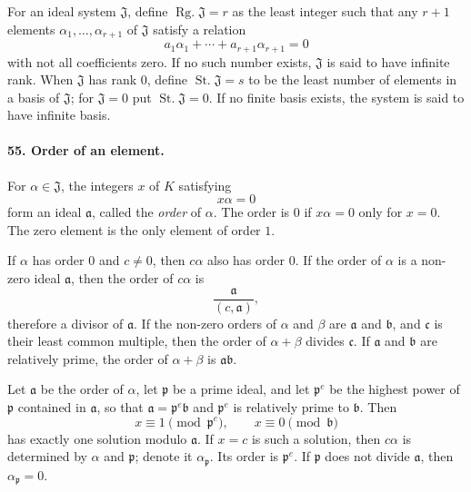 \documentclass[11pt]{article}
\newcommand{\Rg}{\operatorname{Rg.}}
\newcommand{\St}{\operatorname{St.}}
\begin{document}
For an ideal system $\mathfrak J$, define $\Rg\mathfrak J=r$ as the least integer such that any $r+1$ elements $\alpha_1,
\ldots,\alpha_{r+1}$ of $\mathfrak J$ satisfy a relation
\[
  a_1\alpha_1+\cdots+a_{r+1}\alpha_{r+1}=0
\]
with not all coefficients zero. If no such number exists, $\mathfrak J$ is said to have infinite rank. When $\mathfrak J$ has rank $0$, define $\St\mathfrak J=s$ to be the least number of elements in a basis of $\mathfrak J$; for $\mathfrak J=0$ put $\St\mathfrak J=0$. If no finite basis exists, the system is said to have infinite basis.

\paragraph{55. Order of an element.}
For $\alpha\in\mathfrak J$, the integers $x$ of $K$ satisfying
\[
  x\alpha=0
\]
form an ideal $\mathfrak a$, called the \emph{order} of $\alpha$. The order is $0$ if $x\alpha=0$ only for $x=0$. The zero element is the only element of order $1$.

If $\alpha$ has order $0$ and $c\ne0$, then $c\alpha$ also has order $0$. If the order of $\alpha$ is a non-zero ideal $\mathfrak a$, then the order of $c\alpha$ is
\[
  \frac{\mathfrak a}{(c,\mathfrak a)},
\]
therefore a divisor of $\mathfrak a$. If the non-zero orders of $\alpha$ and $\beta$ are $\mathfrak a$ and $\mathfrak b$, and $\mathfrak c$ is their least common multiple, then the order of $\alpha+\beta$ divides $\mathfrak c$. If $\mathfrak a$ and $\mathfrak b$ are relatively prime, the order of $\alpha+\beta$ is $\mathfrak a\mathfrak b$.

Let $\mathfrak a$ be the order of $\alpha$, let $\mathfrak p$ be a prime ideal, and let $\mathfrak p^e$ be the highest power of $\mathfrak p$ contained in $\mathfrak a$, so that $\mathfrak a=\mathfrak p^e\mathfrak b$ and $\mathfrak p^e$ is relatively prime to $\mathfrak b$. Then
\begin{equation}
  x\equiv1\pmod{\mathfrak p^e},
  \qquad
  x\equiv0\pmod{\mathfrak b}
\tag{88}
\end{equation}
has exactly one solution modulo $\mathfrak a$. If $x=c$ is such a solution, then $c\alpha$ is determined by $\alpha$ and $\mathfrak p$; denote it $\alpha_{\mathfrak p}$. Its order is $\mathfrak p^e$. If $\mathfrak p$ does not divide $\mathfrak a$, then $\alpha_{\mathfrak p}=0$.
\end{document}
